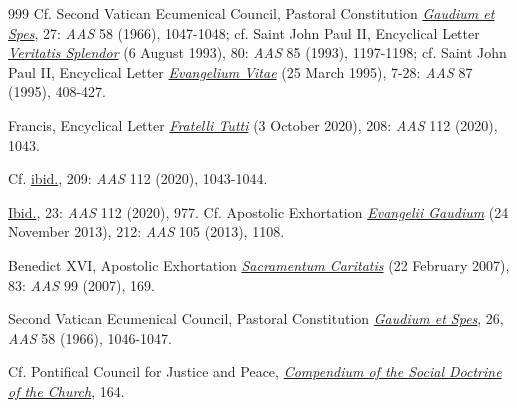 \documentclass{article}
\begin{document}
\begin{thebibliography}{999}
 Cf. Second Vatican Ecumenical Council, Pastoral Constitution \href{https://www.vatican.va/archive/hist_councils/ii_vatican_council/documents/vat-ii_const_19651207_gaudium-et-spes_en.html}{\emph{Gaudium et Spes}}, 27: \emph{AAS} 58 (1966), 1047-1048; cf. Saint John Paul II, Encyclical Letter \href{https://www.vatican.va/content/john-paul-ii/en/encyclicals/documents/hf_jp-ii_enc_06081993_veritatis-splendor.html}{\emph{Veritatis Splendor}} (6 August 1993), 80: \emph{AAS} 85 (1993), 1197-1198; cf. Saint John Paul II, Encyclical Letter \href{https://www.vatican.va/content/john-paul-ii/en/encyclicals/documents/hf_jp-ii_enc_25031995_evangelium-vitae.html}{\emph{Evangelium Vitae}} (25 March 1995), 7-28: \emph{AAS} 87 (1995), 408-427.

 Francis, Encyclical Letter \href{https://www.vatican.va/content/francesco/en/encyclicals/documents/papa-francesco_20201003_enciclica-fratelli-tutti.html}{\emph{Fratelli Tutti}} (3 October 2020), 208: \emph{AAS} 112 (2020), 1043.

 Cf. \href{https://www.vatican.va/content/francesco/en/encyclicals/documents/papa-francesco_20201003_enciclica-fratelli-tutti.html}{ibid.}, 209: \emph{AAS} 112 (2020), 1043-1044.

 \href{https://www.vatican.va/content/francesco/en/encyclicals/documents/papa-francesco_20201003_enciclica-fratelli-tutti.html}{Ibid.}, 23: \emph{AAS} 112 (2020), 977. Cf. Apostolic Exhortation \href{https://www.vatican.va/content/francesco/en/apost_exhortations/documents/papa-francesco_esortazione-ap_20131124_evangelii-gaudium.html}{\emph{Evangelii Gaudium}} (24 November 2013), 212: \emph{AAS} 105 (2013), 1108.

 Benedict XVI, Apostolic Exhortation \href{https://www.vatican.va/content/benedict-xvi/en/apost_exhortations/documents/hf_ben-xvi_exh_20070222_sacramentum-caritatis.html}{\emph{Sacramentum Caritatis}} (22 February 2007), 83: \emph{AAS} 99 (2007), 169.

 Second Vatican Ecumenical Council, Pastoral Constitution \href{https://www.vatican.va/archive/hist_councils/ii_vatican_council/documents/vat-ii_const_19651207_gaudium-et-spes_en.html}{\emph{Gaudium et Spes}}, 26, \emph{AAS} 58 (1966), 1046-1047.

 Cf. Pontifical Council for Justice and Peace, \href{https://www.vatican.va/roman_curia/pontifical_councils/justpeace/documents/rc_pc_justpeace_doc_20060526_compendio-dott-soc_en.html}{\emph{Compendium of the Social Doctrine of the Church}}, 164.


\end{thebibliography}
\end{document}
